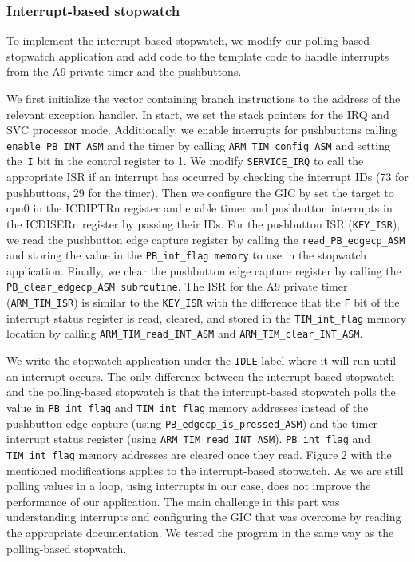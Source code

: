 \documentclass[10pt]{article}
\begin{document}
\subsubsection*{Interrupt-based stopwatch}
To implement the interrupt-based stopwatch, we modify our polling-based stopwatch application and add code to the template code to handle interrupts from the A9 private timer and the pushbuttons.

We first initialize the vector containing branch instructions to the address of the relevant exception handler. In start, we set the stack pointers for the IRQ and SVC processor mode. Additionally, we enable interrupts for pushbuttons calling \verb+enable_PB_INT_ASM+ and the timer by calling \verb+ARM_TIM_config_ASM+ and setting the\verb+ I+ bit in the control register to 1. We modify \verb+SERVICE_IRQ+ to call the appropriate ISR if an interrupt has occurred by checking the interrupt IDs (73 for pushbuttons, 29 for the timer). Then we configure the GIC by set the target to cpu0 in the ICDIPTRn register and enable timer and pushbutton interrupts in the ICDISERn register by passing their IDs. For the pushbutton ISR (\verb+KEY_ISR+), we read the pushbutton edge capture register by calling the \verb+read_PB_edgecp_ASM+ and storing the value in the \verb+PB_int_flag memory+ to use in the stopwatch application. Finally, we clear the pushbutton edge capture register by calling the \verb+PB_clear_edgecp_ASM subroutine+. The ISR for the A9 private timer (\verb+ARM_TIM_ISR+) is similar to the \verb+KEY_ISR+ with the difference that the \verb+F+ bit of the interrupt status register is read, cleared, and stored in the \verb+TIM_int_flag+ memory location by calling \verb+ARM_TIM_read_INT_ASM+ and \verb+ARM_TIM_clear_INT_ASM+.

We write the stopwatch application under the \verb+IDLE+ label where it will run until an interrupt occurs. The only difference between the interrupt-based stopwatch and the polling-based stopwatch is that the interrupt-based stopwatch polls the value in \verb+PB_int_flag+ and \verb+TIM_int_flag+ memory addresses instead of the pushbutton edge capture (using \verb+PB_edgecp_is_pressed_ASM+) and the timer interrupt status register (using \verb+ARM_TIM_read_INT_ASM+). \verb+PB_int_flag+ and \verb+TIM_int_flag+ memory addresses are cleared once they read. Figure 2 with the mentioned modifications applies to the interrupt-based stopwatch. As we are still polling values in a loop, using interrupts in our case, does not improve the performance of our application.
The main challenge in this part was understanding interrupts and configuring the GIC that was overcome by reading the appropriate documentation. We tested the program in the same way as the polling-based stopwatch.
\end{document}
